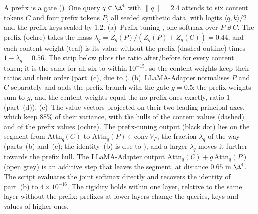 A prefix is a gate (). One query $q\in\R^4$ with $\lVert q\rVert=2.4$ attends to six content tokens $C$ and four prefix tokens $P$, all seeded synthetic data, with logits $\langle q,k\rangle/2$ and the prefix keys scaled by $1.2$. (a)~Prefix tuning \citep{li2021prefix}, one softmax over $P\uplus C$. The prefix (ochre) takes the mass $\lambda_q=Z_q(P)/(Z_q(P)+Z_q(C))=0.44$, and each content weight (teal) is its value without the prefix (dashed outline) times $1-\lambda_q=0.56$. The strip below plots the ratio after/before for every content token; it is the same for all six to within $10^{-15}$, so the content weights keep their ratios and their order (part~(c), due to \citet{petrov2023prompting}). (b)~LLaMA-Adapter \citep{zhang2023llama} normalises $P$ and $C$ separately and adds the prefix branch with the gate $g=0.5$: the prefix weights sum to $g$, and the content weights equal the no-prefix ones exactly, ratio $1$ (part~(d)). (c)~The value vectors projected on their two leading principal axes, which keep 88\% of their variance, with the hulls of the content values (dashed) and of the prefix values (ochre). The prefix-tuning output (black dot) lies on the segment from $\mathrm{Attn}_q(C)$ to $\mathrm{Attn}_q(P)\in\mathrm{conv}\,V_P$, the fraction $\lambda_q$ of the way (parts~(b) and~(c); the identity~(b) is due to \citet{he2021unified}), and a larger $\lambda_q$ moves it further towards the prefix hull. The LLaMA-Adapter output $\mathrm{Attn}_q(C)+g\,\mathrm{Attn}_q(P)$ (open grey) is an additive step that leaves the segment, at distance $0.65$ in $\R^4$. The script evaluates the joint softmax directly and recovers the identity of part~(b) to $4\times10^{-16}$. The rigidity holds within one layer, relative to the same layer without the prefix: prefixes at lower layers change the queries, keys and values of higher ones.
